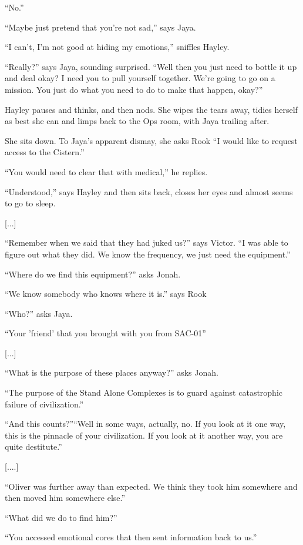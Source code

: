 ``No.''

``Maybe just pretend that you're not sad,'' says Jaya.

``I can't, I'm not good at hiding my emotions,'' sniffles Hayley.

``Really?'' says Jaya, sounding surprised.  ``Well then you just need to bottle it up and deal okay?  I need you to pull yourself together.  We're going to go on a mission.  You just do what you need to do to make that happen, okay?''

Hayley pauses and thinks, and then nods.  She wipes the tears away, tidies herself as best she can and limps back to the Ops room, with Jaya trailing after.



She sits down.  To Jaya's apparent dismay, she asks Rook ``I would like to request access to the Cistern.''

``You would need to clear that with medical,'' he replies.

``Understood,'' says Hayley and then sits back, closes her eyes and almost seems to go to sleep.

{[}...{]}

``Remember when we said that they had juked us?'' says Victor.  ``I was able to figure out what they did.  We know the frequency, we just need the equipment.''

``Where do we find this equipment?'' asks Jonah.

``We know somebody who knows where it is.'' says Rook

``Who?'' asks Jaya.

``Your 'friend' that you brought with you from SAC-01'' 

{[}...{]}

``What is the purpose of these places anyway?'' asks Jonah.

``The purpose of the Stand Alone Complexes is to guard against catastrophic failure of civilization.''

``And this counts?''``Well in some ways, actually, no.  If you look at it one way, this is the pinnacle of your civilization. If you look at it another way, you are quite destitute.''

{[}....{]}

``Oliver was further away than expected.  We think they took him somewhere and then moved him somewhere else.''

``What did we do to find him?''

``You accessed emotional cores that then sent information back to us.''


